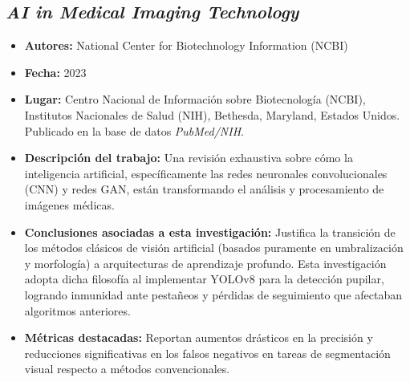 \subsection{\textit{AI in Medical Imaging Technology}}
\begin{itemize}
	\item \textbf{Autores:} National Center for Biotechnology Information (NCBI) \cite{ncbi2023ai}
	\item \textbf{Fecha:} 2023
	\item \textbf{Lugar:} Centro Nacional de Información sobre Biotecnología (NCBI), Institutos Nacionales de Salud (NIH), Bethesda, Maryland, Estados Unidos. Publicado en la base de datos \textit{PubMed/NIH}.
	\item \textbf{Descripción del trabajo:} Una revisión exhaustiva sobre cómo la inteligencia artificial, específicamente las redes neuronales convolucionales (CNN) y redes GAN, están transformando el análisis y procesamiento de imágenes médicas.
	\item \textbf{Conclusiones asociadas a esta investigación:} Justifica la transición de los métodos clásicos de visión artificial (basados puramente en umbralización y morfología) a arquitecturas de aprendizaje profundo. Esta investigación adopta dicha filosofía al implementar YOLOv8 para la detección pupilar, logrando inmunidad ante pestañeos y pérdidas de seguimiento que afectaban algoritmos anteriores.
	\item \textbf{Métricas destacadas:} Reportan aumentos drásticos en la precisión y reducciones significativas en los falsos negativos en tareas de segmentación visual respecto a métodos convencionales.
\end{itemize}

